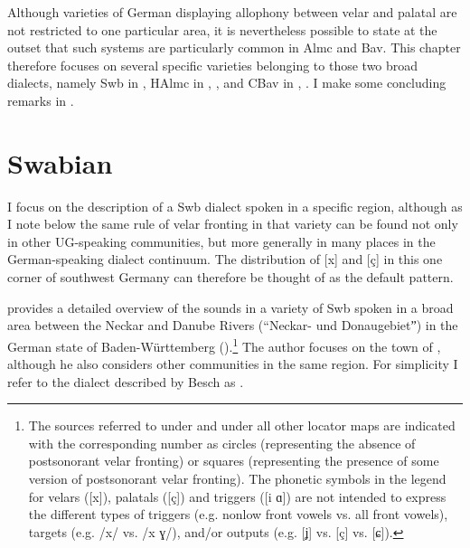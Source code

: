 Although varieties of German displaying allophony between velar and palatal are not restricted to one particular area, it is nevertheless possible to state at the outset that such systems are particularly common in Almc and Bav. This chapter therefore focuses on several specific varieties belonging to those two broad dialects, namely Swb in , HAlmc in , , and CBav in , . I make some concluding remarks in .

\section{Swabian}\label{sec:3.2}

I focus on the description of a Swb dialect spoken in a specific region, although as I note below the same rule of velar fronting in that variety can be found not only in other UG-speaking communities, but more generally in many places in the German-speaking dialect continuum. The distribution of [x] and [ç] in this one corner of southwest Germany can therefore be thought of as the default pattern.

\citet{Besch1961} provides a detailed overview of the sounds in a variety of Swb spoken in a broad area between the Neckar and Danube Rivers (“Neckar- und Donaugebietˮ) in the German state of Baden-Württemberg ().\footnote{{The sources referred to under  and under all other locator maps are indicated with the corresponding number as circles (representing the absence of postsonorant velar fronting) or squares (representing the presence of some version of postsonorant velar fronting). The phonetic symbols in the legend for velars ([x]), palatals ([ç]) and triggers ([i ɑ]) are not intended to express the different types of triggers (e.g. nonlow front vowels vs. all front vowels), targets (e.g. /x/ vs. /x ɣ/), and/or outputs (e.g. [ʝ] vs. [ç] vs. [ɕ]).}} The author focuses on the town of , although he also considers other communities in the same region. For simplicity I refer to the dialect described by Besch as .

